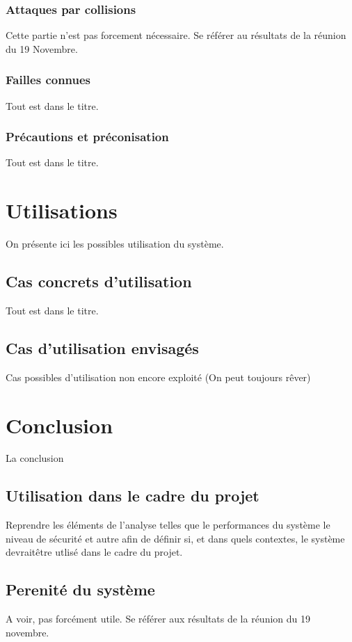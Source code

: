 \documentclass{../res/univ-projet}
\begin{document}
    \subsubsection{Attaques par collisions}
      Cette partie n'est pas forcement nécessaire. Se référer au résultats de la 
réunion du 19 Novembre.
    
    \subsubsection{Failles connues}
      Tout est dans le titre.
    
    \subsubsection{Précautions et préconisation}
      Tout est dans le titre.
  
\section{Utilisations}
  On présente ici les possibles utilisation du système.
  \subsection{Cas concrets d'utilisation}
    Tout est dans le titre.
  
  \subsection{Cas d'utilisation envisagés}
    Cas possibles d'utilisation non encore exploité (On peut toujours r\^ever)

\section{Conclusion}
  La conclusion
  \subsection{Utilisation dans le cadre du projet}
    Reprendre les éléments de l'analyse telles que le performances du système le 
niveau de sécurité et autre afin de définir si, et dans quels contextes, le 
système devrait\^etre utlisé dans le cadre du projet.
  
  \subsection{Perenité du système}
    A voir, pas forcément utile. Se référer aux résultats de la réunion du 19 
novembre.
    
\end{document}
